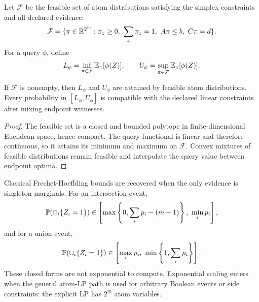 Let $\mathcal{F}$ be the feasible set of atom distributions satisfying the
simplex constraints and all declared evidence:
\[
  \mathcal{F} = \{\pi \in \R^{2^m}: \pi_z \ge 0,\ \sum_z \pi_z = 1,\ A\pi \le b,\ C\pi=d\}.
\]
For a query $\phi$, define
\[
  L_\phi = \inf_{\pi\in\mathcal{F}}\mathbb{E}_\pi[\phi(Z)],
  \qquad
  U_\phi = \sup_{\pi\in\mathcal{F}}\mathbb{E}_\pi[\phi(Z)].
\]

\begin{theorem}
If $\mathcal{F}$ is nonempty, then $L_\phi$ and $U_\phi$ are attained by
feasible atom distributions. Every probability in $[L_\phi,U_\phi]$ is
compatible with the declared linear constraints after mixing endpoint
witnesses.
\end{theorem}

\begin{proof}
The feasible set is a closed and bounded polytope in finite-dimensional
Euclidean space, hence compact. The query functional is linear and therefore
continuous, so it attains its minimum and maximum on $\mathcal{F}$. Convex
mixtures of feasible distributions remain feasible and interpolate the query
value between endpoint optima.
\end{proof}

Classical Frechet-Hoeffding bounds are recovered when the only evidence is
singleton marginals. For an intersection event,
\[
  \mathbb{P}(\cap_i \{Z_i=1\}) \in
  \left[\max\left\{0,\sum_i p_i-(m-1)\right\},\ \min_i p_i\right],
\]
and for a union event,
\[
  \mathbb{P}(\cup_i \{Z_i=1\}) \in
  \left[\max_i p_i,\ \min\left\{1,\sum_i p_i\right\}\right].
\]
These closed forms are not exponential to compute. Exponential scaling enters
when the general atom-LP path is used for arbitrary Boolean events or side
constraints: the explicit LP has $2^m$ atom variables.

